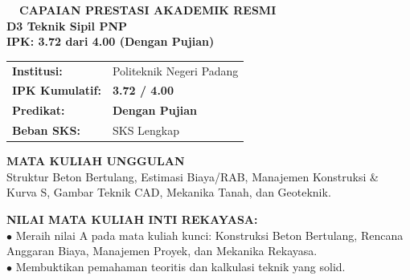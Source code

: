 \documentclass[10pt,a4paper,landscape]{article}
\begin{document}
\noindent
\begin{minipage}[t]{0.30\linewidth}
  \vspace{0pt}
  \begin{tcolorbox}[sharp corners, boxrule=0.8pt, colframe=pborder, colback=white, left=3mm, right=3mm, top=2.5mm, bottom=2.5mm, height=100mm]
    \colorbox{pred}{\fontsize{7pt}{8pt}\selectfont\bfseries\color{white}\ \ CAPAIAN PRESTASI AKADEMIK RESMI\ \ }\\[1.5mm]
    {\fontsize{9.5pt}{11.5pt}\selectfont\bfseries\color{pnavy}D3 Teknik Sipil PNP}\\[0.5mm]
    {\fontsize{7pt}{8.5pt}\selectfont\bfseries\color{pred}IPK: 3.72 dari 4.00 (Dengan Pujian)}\\[2mm]

    \begin{tcolorbox}[sharp corners, boxrule=0.5pt, colframe=pborder, colback=pbglight, left=2mm, right=2mm, top=1.5mm, bottom=1.5mm]
      \begin{tabularx}{\linewidth}{@{}p{22mm} X@{}}
        {\fontsize{6.8pt}{8pt}\selectfont\bfseries Institusi:} & {\fontsize{6.8pt}{8pt}\selectfont Politeknik Negeri Padang} \\[0.8mm]
        {\fontsize{6.8pt}{8pt}\selectfont\bfseries IPK Kumulatif:} & {\fontsize{6.8pt}{8pt}\selectfont\bfseries\color{pred} 3.72 / 4.00} \\[0.8mm]
        {\fontsize{6.8pt}{8pt}\selectfont\bfseries Predikat:} & {\fontsize{6.8pt}{8pt}\selectfont\bfseries Dengan Pujian} \\[0.8mm]
        {\fontsize{6.8pt}{8pt}\selectfont\bfseries Beban SKS:} & {\fontsize{6.8pt}{8pt}\selectfont 115 SKS Lengkap}
      \end{tabularx}
    \end{tcolorbox}
    \vspace{1.5mm}

    {\fontsize{7.5pt}{9pt}\selectfont\bfseries\color{pnavy}MATA KULIAH UNGGULAN}\\[0.8mm]
    {\fontsize{6.5pt}{8.2pt}\selectfont\color{psteel}
    Struktur Beton Bertulang, Estimasi Biaya/RAB, Manajemen Konstruksi \& Kurva S, Gambar Teknik CAD, Mekanika Tanah, dan Geoteknik.
    }
  \end{tcolorbox}
  \vspace{2mm}

  \begin{tcolorbox}[sharp corners, boxrule=0.6pt, colframe=pnavy, colback=pbglight, left=2.5mm, right=2.5mm, top=2mm, bottom=2mm, height=52mm]
    {\fontsize{7pt}{8.5pt}\selectfont\bfseries\color{pnavy}NILAI MATA KULIAH INTI REKAYASA:}\\[1.5mm]
    {\fontsize{6.5pt}{8.2pt}\selectfont\color{psteel}
    $\bullet$ Meraih nilai A pada mata kuliah kunci: Konstruksi Beton Bertulang, Rencana Anggaran Biaya, Manajemen Proyek, dan Mekanika Rekayasa.\\
    $\bullet$ Membuktikan pemahaman teoritis dan kalkulasi teknik yang solid.
    }
  \end{tcolorbox}
\end{minipage}%
\end{document}
